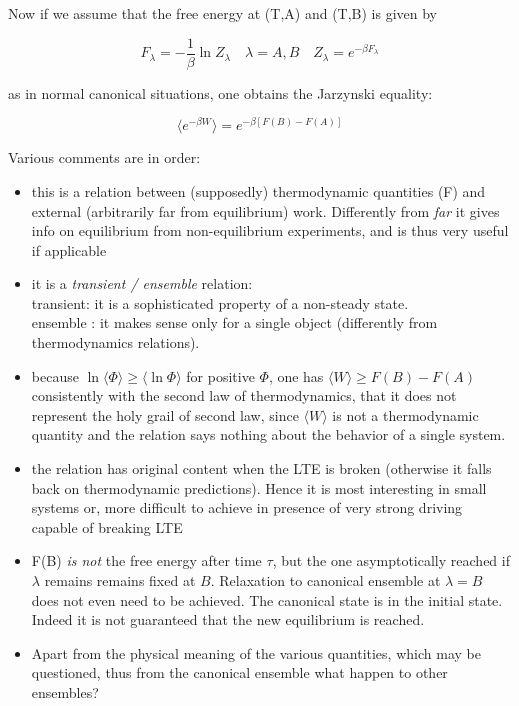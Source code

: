 \documentclass{article}
\begin{document}
Now if we assume that the free energy at (T,A) and (T,B) is given by

$$ F_{\lambda} = - \frac{1}{\beta} \ln Z_{\lambda} \quad \lambda = A,B \quad Z_{\lambda}=e^{-\beta F_{\lambda}}$$

as in normal canonical situations, one obtains the Jarzynski equality:

\begin{equation}
\langle e^{-\beta W} \rangle = e^{-\beta [F(B)-F(A)]}
\end{equation}

Various comments are in order:

\begin{itemize}
	\item this is a relation between (supposedly) thermodynamic quantities (F) and external (arbitrarily far from equilibrium) work. Differently from \emph{far} it gives info on equilibrium from non-equilibrium experiments, and is thus very useful if applicable
	\item it is a \emph{transient / ensemble} relation: \\
			transient: it is a  sophisticated property of a non-steady state.\\
			ensemble : it makes sense only for a single object (differently from thermodynamics relations).\\
	\item because $ \ln \langle \Phi \rangle \geq \langle \ln \Phi \rangle$ for positive $\Phi$, one has $\langle W \rangle \geq F(B) - F(A)$ consistently with the second law of thermodynamics, that it does not represent the holy grail of second law, since $\langle W \rangle$ is not a thermodynamic quantity and the relation says nothing about the behavior of a single system.
	\item the relation has original content when the LTE is broken (otherwise it falls back on thermodynamic predictions). Hence it is most interesting in small systems or, more difficult to achieve in presence of very strong driving capable of breaking LTE
	\item F(B) \emph{is not} the free energy after time $\tau$, but the one asymptotically reached if $\lambda$ remains remains fixed at $B$. Relaxation to canonical ensemble at $\lambda=B$ does not even need to be achieved. The canonical state is in the initial state. Indeed it is not guaranteed that the new equilibrium is reached.
	\item Apart from the physical meaning of the various quantities, which may be questioned, thus from the canonical ensemble what happen to other ensembles?
\end{itemize}
\end{document}
